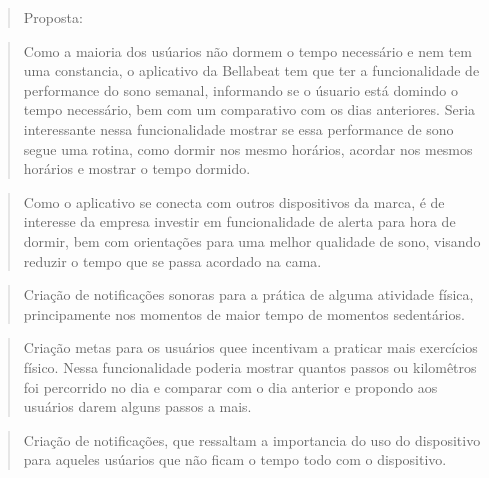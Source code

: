 \documentclass[a4paper, oneside]{report}
\begin{document}
\begin{quotation}
Proposta:
\end{quotation}
\begin{quotation}
Como a maioria dos usúarios não dormem o tempo necessário e nem tem uma constancia, o aplicativo da Bellabeat tem que ter a funcionalidade de performance do sono semanal, informando se o úsuario está domindo o tempo necessário, bem com um comparativo com os dias anteriores. Seria interessante nessa funcionalidade mostrar se essa performance de sono segue uma rotina, como dormir nos mesmo horários, acordar nos mesmos horários e mostrar o tempo dormido.
\end{quotation}
\begin{quotation}
Como o aplicativo se conecta com outros dispositivos da marca, é de interesse da empresa investir em funcionalidade de alerta para hora de dormir, bem com orientações para uma melhor qualidade de sono, visando reduzir o tempo que se passa acordado na cama.
\end{quotation}
\begin{quotation}
Criação de notificações sonoras para a prática de alguma atividade física, principamente nos momentos de maior tempo de momentos sedentários.
\end{quotation}
\begin{quotation}
Criação metas para os usuários quee incentivam a praticar mais exercícios físico. Nessa funcionalidade poderia mostrar quantos passos ou kilomêtros foi percorrido no dia e comparar com o dia anterior e propondo aos usuários darem alguns passos a mais.
\end{quotation}
\begin{quotation}
Criação de notificações, que ressaltam a importancia do uso do dispositivo para aqueles usúarios que não ficam o tempo todo com o dispositivo.
\end{quotation}
\end{document}
